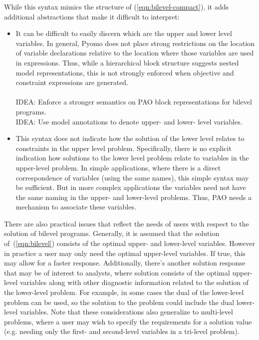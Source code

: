 While this syntax mimics the structure of (\ref{eqn:bilevel-compact}), it adds additional abstractions that make it difficult to interpret:
\begin{itemize}

\item It can be difficult to easily discern which are the upper and lower level variables.  In general, Pyomo does not place strong restrictions on the location of variable declarations relative to the location where those variables are used in expressions.  Thus, while a hierarchical block structure suggests nested model representations, this is not strongly enforced when objective and constraint expressions are generated.\\
\mbox{}\\
IDEA: Enforce a stronger semantics on PAO block representations for bilevel programs.\\
IDEA: Use model annotations to denote upper- and lower- level variables.\\

\item This syntax does not indicate how the solution of the lower level relates to constraints in the upper level problem.  Specifically, there is no explicit indication how solutions to the lower level problem relate to variables in the upper-level problem.  In simple applications, where there is a direct correspondence of variables (using the same names), this simple syntax may be sufficient.  But in more complex applications the variables need not have the same naming in the upper- and lower-level problems.  Thus, PAO needs a mechanism to associate these variables.

\end{itemize}

There are also practical issues that reflect the needs of users with
respect to the solution of bilevel programs.  Generally, it is assumed
that the solution of~(\ref{eqn:bilevel}) consists of the optimal upper-
and lower-level variables.  However in practice a user may only need
the optimal upper-level variables.  If true, this may allow for a
faster response.  Additionally, there's another solution response that
may be of interest to analysts, where solution consists of the optimal
upper-level variables along with other diagnostic information related
to the solution of the lower-level problem.  For example, in some cases
the dual of the lower-level problem can be used, so the solution to the
problem could include the dual lower-level variables.  Note that these
considerations also generalize to multi-level problems, where a user may
wish to specify the requirements for a solution value (e.g. needing only
the first- and second-level variables in a tri-level problem).

